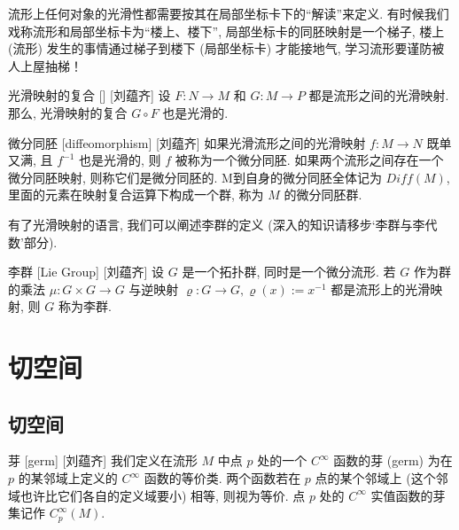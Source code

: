 \documentclass[UTF8]{ctexart}
\begin{document}
        \begin{rmk}
            []
            流形上任何对象的光滑性都需要按其在局部坐标卡下的“解读”来定义. 
            有时候我们戏称流形和局部坐标卡为“楼上、楼下”, 局部坐标卡的同胚映射是一个梯子, 楼上 (流形) 发生的事情通过梯子到楼下 (局部坐标卡) 才能接地气, 
            学习流形要谨防被人上屋抽梯！
        \end{rmk}

        \begin{ppt}
            []
            {光滑映射的复合}
            []
            [刘蕴齐]
            设 \(F: N \rightarrow M\)  和  \(G: M \rightarrow P\) 都是流形之间的光滑映射. 那么, 光滑映射的复合 \(G \circ F\) 也是光滑的. 
        \end{ppt}
        
        \vspace{10pt}
        
        \begin{dfn}
            []
            {微分同胚}
            [diffeomorphism]
            [刘蕴齐]
            如果光滑流形之间的光滑映射 \( f:M \rightarrow N\) 既单又满, 且 \(f^{-1}\) 也是光滑的, 
            则 \(f\) 被称为一个微分同胚. 
            如果两个流形之间存在一个微分同胚映射, 则称它们是微分同胚的. 
            M到自身的微分同胚全体记为 \(Diff(M)\),
            里面的元素在映射复合运算下构成一个群, 称为 \(M\) 的微分同胚群. 
        \end{dfn}

        有了光滑映射的语言, 我们可以阐述李群的定义 (深入的知识请移步‘李群与李代数’部分). 

        \begin{dfn}
            []
            {李群}
            [Lie Group]
            [刘蕴齐]
            设 \(G\) 是一个拓扑群, 同时是一个微分流形. 若 \(G\) 作为群的乘法 \(\mu: G \times G \rightarrow G\) 与逆映射
             \(\varrho: G \rightarrow G, \varrho(x):= x^{-1}\) 
            都是流形上的光滑映射, 则 \(G\) 称为李群. 
        \end{dfn}

    
\section{切空间}

    \subsection{切空间}

        \begin{dfn}
            []
            {芽}
            [germ]
            [刘蕴齐]
            我们定义在流形 \(M\) 中点 \(p\) 处的一个 \(C^{\infty}\) 函数的芽 (germ) 为在 \(p\) 的某邻域上定义的 \(C^{\infty}\) 函数的等价类. 两个函数若在 \(p\) 点的某个邻域上 (这个邻域也许比它们各自的定义域要小) 相等, 则视为等价. 点 \(p\) 处的 \(C^{\infty}\) 实值函数的芽集记作 \(C^{\infty}_p(M)\). 
        \end{dfn}
\end{document}
